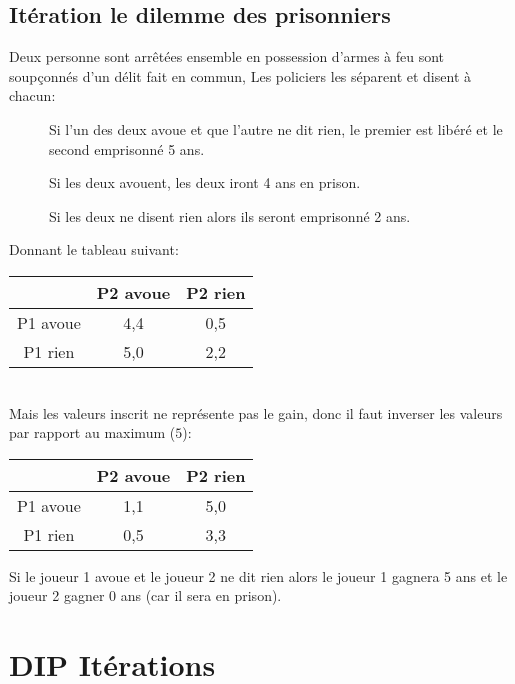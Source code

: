 \subsection{Itération le dilemme des prisonniers}
Deux personne sont arrêtées ensemble en possession d'armes à feu sont soupçonnés d'un délit fait en commun, Les policiers les séparent et disent à chacun:
\begin{description}
\item[] Si l'un des deux avoue et que l'autre ne dit rien, le premier est libéré et le second emprisonné 5 ans.
\item[] Si les deux avouent, les deux iront 4 ans en prison.
\item[] Si les deux ne disent rien alors ils seront emprisonné 2 ans.
\end{description}

Donnant le tableau suivant:
\begin{tabular}{c|cc}
$ $ & P2 avoue & P2 rien\\
\hline
P1 avoue & 4,4 & 0,5\\
P1 rien  & 5,0 & 2,2\\
\end{tabular}

\ \\
Mais les valeurs inscrit ne représente pas le gain, donc il faut inverser les valeurs par rapport au maximum ($5$):\\

\begin{tabular}{c|cc}
$ $ & P2 avoue & P2 rien\\
\hline
P1 avoue & 1,1 & 5,0\\
P1 rien  & 0,5 & 3,3\\
\end{tabular}

Si le joueur 1 avoue et le joueur 2 ne dit rien alors le joueur 1 gagnera 5 ans et le joueur 2 gagner 0 ans (car il sera en prison).\\

\section{DIP Itérations}

